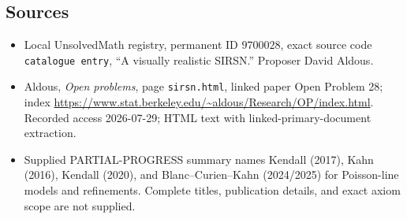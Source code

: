\documentclass[11pt]{article}
\begin{document}
\subsection{Sources}
\begin{itemize}
\item Local UnsolvedMath registry, permanent ID \(9700028\), exact source code \texttt{catalogue entry}, ``A visually realistic SIRSN.'' Proposer David Aldous.
\item Aldous, \emph{Open problems}, page \texttt{sirsn.html}, linked paper Open Problem 28; index \url{https://www.stat.berkeley.edu/~aldous/Research/OP/index.html}. Recorded access 2026-07-29; HTML text with linked-primary-document extraction.
\item Supplied PARTIAL-PROGRESS summary names Kendall (2017), Kahn (2016), Kendall (2020), and Blanc--Curien--Kahn (2024/2025) for Poisson-line models and refinements. Complete titles, publication details, and exact axiom scope are not supplied.
\end{itemize}
\end{document}
